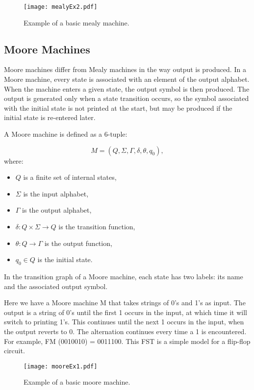 \begin{figure}[htbp]
    \centering
    \texttt{[image: mealyEx2.pdf]}
    \caption{Example of a basic mealy machine.}
    \label{fig:3}
\end{figure}


\subsection{Moore Machines}

Moore machines differ from Mealy machines in the way output is produced. In a Moore machine, every state is associated with an element of the output alphabet. 
When the machine enters a given state, the output symbol is then produced. The output is generated only when a state transition occurs, 
so the symbol associated with the initial state is not printed at the start, but may be produced if the initial state is re-entered later.

A Moore machine is defined as a 6-tuple:

\[
M = (Q, \Sigma, \Gamma, \delta, \theta, q_0),
\]
where:
\begin{itemize}
    \item $Q$ is a finite set of internal states,
    \item $\Sigma$ is the input alphabet,
    \item $\Gamma$ is the output alphabet,
    \item $\delta: Q \times \Sigma \rightarrow Q$ is the transition function,
    \item $\theta: Q \rightarrow \Gamma$ is the output function,
    \item $q_0 \in Q$ is the initial state.
\end{itemize}

In the transition graph of a Moore machine, each state has two labels: its name and the associated output symbol.

Here we have a Moore machine M that takes strings of 0's and 1's as input. The output is a string of
0's until the first 1 occurs in the input, at which time it will switch to printing 1's. This continues
until the next 1 occurs in the input, when the output reverts to 0. The alternation continues
every time a 1 is encountered. For example, FM (0010010) = 0011100. This FST is a simple model for
a flip-flop circuit.

\begin{figure}[htbp]
    \centering
    \texttt{[image: mooreEx1.pdf]}
    \caption{Example of a basic moore machine.}
    \label{fig:4}
\end{figure}

